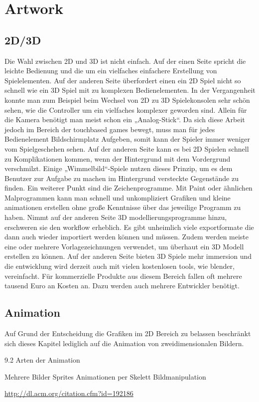 \section{Artwork}
\label{sec:ext_artwork}


\subsection{2D/3D} 
Die Wahl zwischen 2D und 3D ist nicht einfach. Auf der einen Seite spricht die leichte Bedienung und die um ein vielfaches einfachere Erstellung von Spielelementen. Auf der anderen Seite überfordert einen ein 2D Spiel nicht so schnell wie ein 3D Spiel mit zu komplexen Bedienelementen. In der Vergangenheit konnte man zum Beispiel beim Wechsel von 2D zu 3D Spielekonsolen sehr schön sehen, wie die Controller um ein vielfaches komplexer geworden sind. Allein für die Kamera benötigt man meist schon ein „Analog-Stick“. Da sich diese Arbeit jedoch im Bereich der touchbased games bewegt, muss man für jedes Bedienelement Bildschirmplatz Aufgeben, somit kann der Spieler immer weniger vom Spielgeschehen sehen. 
Auf der anderen Seite kann es bei 2D Spielen schnell zu Komplikationen kommen, wenn der Hintergrund mit dem Vordergrund verschmilzt. Einige „Wimmelbild“-Spiele nutzen dieses Prinzip, um es dem Benutzer zur Aufgabe zu machen im Hintergrund versteckte Gegenstände zu finden.  Ein weiterer Punkt sind die Zeichenprogramme. Mit Paint oder ähnlichen Malprogrammen kann man schnell und unkompliziert Grafiken und kleine animationen erstellen ohne große Kenntnisse über das jeweilige Programm zu haben.
Nimmt auf der anderen Seite 3D modellierungsprogramme hinzu, erschweren sie den workflow erheblich. Es gibt unheimlich viele exportformate die dann auch wieder importiert werden können und müssen.  Zudem werden meiste eine oder mehrere Vorlagezeichnungen verwendet, um überhaut ein 3D Modell erstellen zu können.
Auf der anderen Seite bieten 3D Spiele mehr immersion und die entwicklung wird derzeit auch mit vielen kostenlosen tools, wie blender, vereinfacht. Für kommerzielle Produkte aus diesem Bereich fallen oft mehrere tausend Euro an Kosten an. 
Dazu werden auch mehrere Entwickler benötigt.

\subsection{Animation} 
Auf Grund der Entscheidung die Grafiken im 2D Bereich zu belassen beschränkt sich dieses Kapitel lediglich auf die Animation von zweidimensionalen Bildern.

9.2	Arten der Animation 

Mehrere Bilder
Sprites 
Animationen per Skelett
Bildmanipulation

\url{http://dl.acm.org/citation.cfm?id=192186}